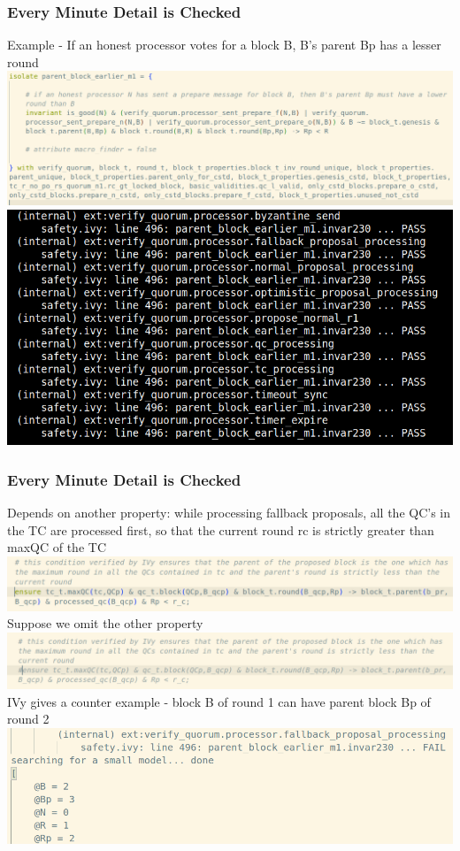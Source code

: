 \documentclass{beamer}
\begin{document}
\begin{frame}
    \frametitle{Every Minute Detail is Checked}
    Example - If an honest processor votes for a block B, B's parent
    Bp has a lesser round
    \includegraphics[scale=0.25]{ParentBlockEarlier.png}
    \pause
    \includegraphics[scale=0.25]{ParentBlockEarlierPass.png}
\end{frame}

\begin{frame}
    \frametitle{Every Minute Detail is Checked}
    Depends on another property: while processing fallback proposals,
    all the QC's in the TC are processed first, so that the current
    round 
    r\textunderscore{}c is strictly greater
    than maxQC of the TC 
    \includegraphics[scale=0.25]{RcGtMaxQC.png}
    \pause
    Suppose we omit the other property
    \includegraphics[scale=0.25]{RcGtMaxQCOmit.png}
    \pause
    IVy gives a counter example - block B of round 1 can have parent
    block Bp of round 2
    \includegraphics[scale=0.25]{ParentBlockEarlierViolated.png}
\end{frame}
\end{document}
